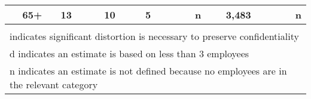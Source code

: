 \begin{table}[htbp]
\begin{center}
\begin{tabular}{rrrrrrrrrrrrr}
65+     &        13& &      10& &          5& &     &n&    3,483& &        &n\\
\hline                                                                        \\
\multicolumn{13}{l}{\footnotesize  * indicates significant distortion   is necessary to preserve confidentiality}\\
\multicolumn{13}{l}{\footnotesize  d indicates an estimate is based on less than 3 employees}\\
\multicolumn{13}{l}{\footnotesize  n indicates an estimate is not defined because no employees are in the relevant category}\\
\end{tabular}
\end{center}
\end{table}

